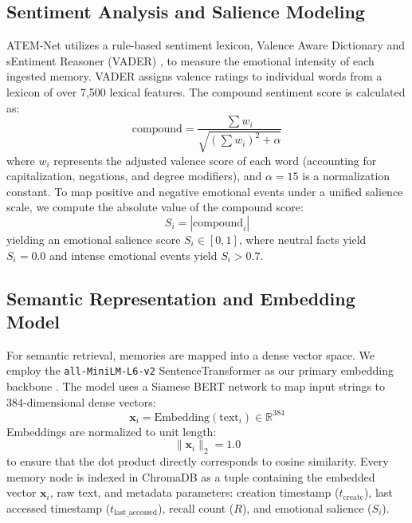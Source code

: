 \documentclass[conference]{IEEEtran}
\begin{document}
\subsection{Sentiment Analysis and Salience Modeling}
ATEM-Net utilizes a rule-based sentiment lexicon, Valence Aware Dictionary and sEntiment Reasoner (VADER) \cite{hutto}, to measure the emotional intensity of each ingested memory. VADER assigns valence ratings to individual words from a lexicon of over 7,500 lexical features. The compound sentiment score is calculated as:
\begin{equation}
\text{compound} = \frac{\sum w_i}{\sqrt{(\sum w_i)^2 + \alpha}}
\end{equation}
where $w_i$ represents the adjusted valence score of each word (accounting for capitalization, negations, and degree modifiers), and $\alpha = 15$ is a normalization constant. To map positive and negative emotional events under a unified salience scale, we compute the absolute value of the compound score:
\begin{equation}
S_i = |\text{compound}_i|
\end{equation}
yielding an emotional salience score $S_i \in [0, 1]$, where neutral facts yield $S_i = 0.0$ and intense emotional events yield $S_i > 0.7$.

\subsection{Semantic Representation and Embedding Model}
For semantic retrieval, memories are mapped into a dense vector space. We employ the \texttt{all-MiniLM-L6-v2} SentenceTransformer as our primary embedding backbone \cite{reimers}. The model uses a Siamese BERT network \cite{devlin} to map input strings to 384-dimensional dense vectors:
\begin{equation}
\mathbf{x}_i = \text{Embedding}(\text{text}_i) \in \mathbb{R}^{384}
\end{equation}
Embeddings are normalized to unit length:
\begin{equation}
\|\mathbf{x}_i\|_2 = 1.0
\end{equation}
to ensure that the dot product directly corresponds to cosine similarity. Every memory node is indexed in ChromaDB as a tuple containing the embedded vector $\mathbf{x}_i$, raw text, and metadata parameters: creation timestamp ($t_{\text{create}}$), last accessed timestamp ($t_{\text{last\_accessed}}$), recall count ($R$), and emotional salience ($S_i$).
\end{document}

